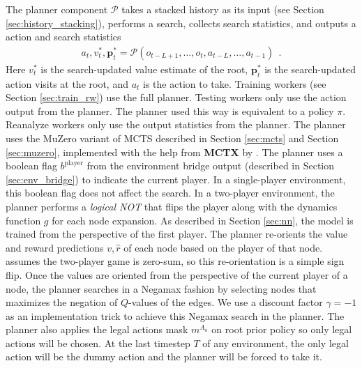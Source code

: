 The planner component $\mathcal{P}$ takes a stacked history as its input (see Section \ref{sec:history_stacking}), performs a search, collects search statistics, and outputs a action and search statistics
\begin{align*}
    a_t, v^*_t, \mathbf{p}^*_t = \mathcal{P}(o_{t - L + 1}, \dots, o_t, a_{t - L}, \dots, a_{t - 1}) ~~ .
\end{align*}
Here $v^*_t$ is the search-updated value estimate of the root, $\mathbf{p}^*_t$ is the search-updated action visits at the root, and $a_t$ is the action to take.
Training workers (see Section \ref{sec:train_rw}) use the full planner.
Testing workers only use the action output from the planner.
The planner used this way is equivalent to a policy $\pi$.
Reanalyze workers only use the output statistics from the planner.
The planner uses the MuZero variant of MCTS described in Section \ref{sec:mcts} and Section \ref{sec:muzero}, implemented with the help from \textbf{MCTX} by \citeauthor{MctxMCTSinJAX_IvoDanihelka_2022} \cite{MctxMCTSinJAX_IvoDanihelka_2022,JAXComposableTransformations_JamesBradbury.RoyFrostig.ea_2018,PolicyImprovementPlanning_Danihelka.Guez.ea_2022}.
The planner uses a boolean flag $b^{\text{player}}$ from the environment bridge output (described in Section \ref{sec:env_bridge}) to indicate the current player.
In a single-player environment, this boolean flag does not affect the search.
In a two-player environment, the planner performs a \textit{logical NOT} that flips the player along with the dynamics function \(g\) for each node expansion.
As described in Section \ref{sec:nn}, the model is trained from the perspective of the first player.
The planner re-orients the value and reward predictions $v, \hat{r}$ of each node based on the player of that node.
\moozi assumes the two-player game is zero-sum, so this re-orientation is a simple sign flip.
Once the values are oriented from the perspective of the current player of a node, the planner searches in a Negamax fashion \cite{HistoryHeuristicAlphabeta_Schaeffer_1989} by selecting nodes that maximizes the negation of $Q$-values of the edges.
We use a discount factor $\gamma = -1$ as an implementation trick to achieve this Negamax search in the planner.
The planner also applies the legal actions mask $m^{A_a}$ on root prior policy so only legal actions will be chosen.
At the last timestep $T$ of any environment, the only legal action will be the dummy action and the planner will be forced to take it.

